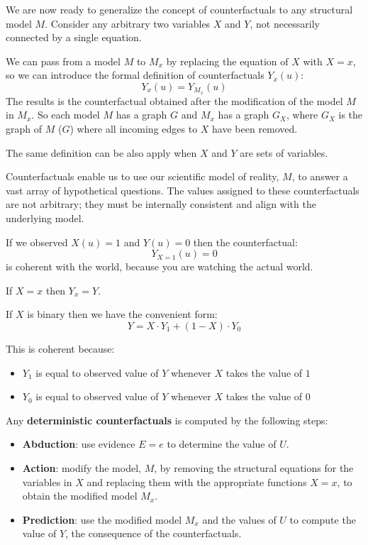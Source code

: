 We are now ready to generalize the concept of counterfactuals to any structural
model $M$. Consider any arbitrary two variables $X$ and $Y$, not necessarily
connected by a single equation.

We can pass from a model $M$ to $M_x$ by replacing the equation of $X$ with $X = x$,
so we can introduce the formal definition of counterfactuals $Y_x (u)$:
\begin{equation}
    Y_x (u) = Y_{M_x}(u)
\end{equation}
The results is the counterfactual obtained after the modification of the model
$M$ in $M_x$. So each model $M$ has a graph $G$ and $M_x$ has a graph $G_X$, where
$G_X$ is the graph of $M$ ($G$) where all incoming edges to $X$ have been removed.

The same definition can be also apply when $X$ and $Y$ are sets of variables.

Counterfactuals enable us to use our scientific model of reality, $M$, to answer
a vast array of hypothetical questions. The values assigned to these counterfactuals
are not arbitrary; they must be internally consistent and align with the underlying model.

\begin{note}
    If we observed $X(u) = 1$ and $Y(u) = 0$ then the counterfactual:
    \begin{equation*}
        Y_{X=1}(u) = 0
    \end{equation*}
    is coherent with the world, because you are watching the actual world.
\end{note}

\begin{definition}
    If $X = x$ then $Y_x = Y$.

    If $X$ is binary then we have the convenient form:
    \begin{equation}
        Y = X \cdot Y_1 + (1 - X) \cdot Y_0
    \end{equation}
\end{definition}
This is coherent because:
\begin{itemize}
    \item $Y_1$ is equal to observed value of $Y$ whenever $X$ takes the value of $1$
    \item $Y_0$ is equal to observed value of $Y$ whenever $X$ takes the value of $0$
\end{itemize}

Any \textbf{deterministic counterfactuals} is computed by the following steps:
\begin{itemize}
    \item \textbf{Abduction}: use evidence $E = e$ to determine the value of $U$.
    \item \textbf{Action}: modify the model, $M$, by removing the structural
          equations for the variables in $X$ and replacing them with the appropriate
          functions $X = x$, to obtain the modified model $M_x$.
    \item \textbf{Prediction}: use the modified model $M_x$ and the values of $U$
          to compute the value of $Y$, the consequence of the counterfactuals.
\end{itemize}

